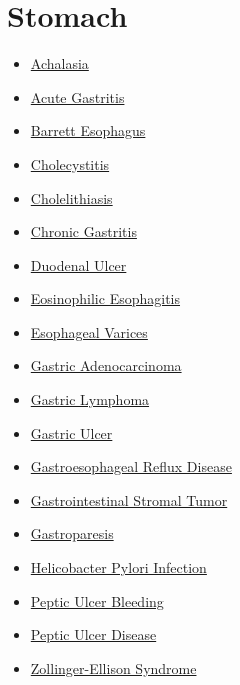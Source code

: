 \section*{Stomach}
\label{sec:organ_stomach}
\begin{itemize}[noitemsep]
  \item \hyperlink{sec:Achalasia}{Achalasia}
  \item \hyperlink{sec:Acute Gastritis}{Acute Gastritis}
  \item \hyperlink{sec:Barrett Esophagus}{Barrett Esophagus}
  \item \hyperlink{sec:Cholecystitis}{Cholecystitis}
  \item \hyperlink{sec:Cholelithiasis}{Cholelithiasis}
  \item \hyperlink{sec:Chronic Gastritis}{Chronic Gastritis}
  \item \hyperlink{sec:Duodenal Ulcer}{Duodenal Ulcer}
  \item \hyperlink{sec:Eosinophilic Esophagitis}{Eosinophilic Esophagitis}
  \item \hyperlink{sec:Esophageal Varices}{Esophageal Varices}
  \item \hyperlink{sec:Gastric Adenocarcinoma}{Gastric Adenocarcinoma}
  \item \hyperlink{sec:Gastric Lymphoma}{Gastric Lymphoma}
  \item \hyperlink{sec:Gastric Ulcer}{Gastric Ulcer}
  \item \hyperlink{sec:Gastroesophageal Reflux Disease}{Gastroesophageal Reflux Disease}
  \item \hyperlink{sec:Gastrointestinal Stromal Tumor}{Gastrointestinal Stromal Tumor}
  \item \hyperlink{sec:Gastroparesis}{Gastroparesis}
  \item \hyperlink{sec:Helicobacter Pylori Infection}{Helicobacter Pylori Infection}
  \item \hyperlink{sec:Peptic Ulcer Bleeding}{Peptic Ulcer Bleeding}
  \item \hyperlink{sec:Peptic Ulcer Disease}{Peptic Ulcer Disease}
  \item \hyperlink{sec:Zollinger-Ellison Syndrome}{Zollinger-Ellison Syndrome}
\end{itemize}

